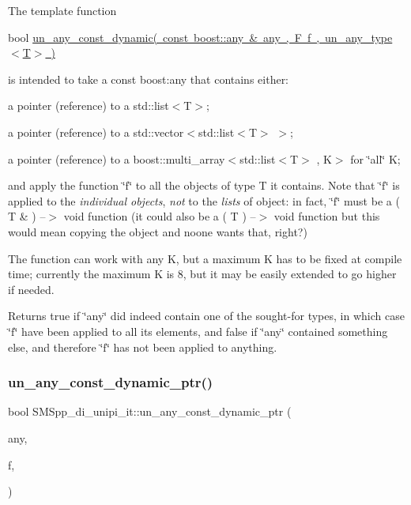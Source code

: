 The template function

bool \mbox{\hyperlink{group__boost__any__stuff_ga4bf31c5fd006a3483e0d5311259bd9e8}{un\+\_\+any\+\_\+const\+\_\+dynamic( const boost\+::any \& any , F f , un\+\_\+any\+\_\+type$<$\+T$>$ )}}

is intended to take a const boost\+:any that contains either\+:


\begin{DoxyItemize}
\item a pointer (reference) to a std\+::list$<$\+T$>$;
\item a pointer (reference) to a std\+::vector$<$std\+::list$<$\+T$>$ $>$;
\item a pointer (reference) to a boost\+::multi\+\_\+array$<$std\+::list$<$\+T$>$ , K$>$ for \char`\"{}all\char`\"{} K;
\end{DoxyItemize}

and apply the function \char`\"{}f\char`\"{} to all the objects of type T it contains. Note that \char`\"{}f\char`\"{} is applied to the {\itshape individual objects}, {\itshape not} to the {\itshape lists} of object\+: in fact, \char`\"{}f\char`\"{} must be a ( T \& ) --$>$ void function (it could also be a ( T ) --$>$ void function but this would mean copying the object and noone wants that, right?)

The function can work with any K, but a maximum K has to be fixed at compile time; currently the maximum K is 8, but it may be easily extended to go higher if needed.

Returns true if \char`\"{}any\char`\"{} did indeed contain one of the sought-\/for types, in which case \char`\"{}f\char`\"{} have been applied to all its elements, and false if \char`\"{}any\char`\"{} contained something else, and therefore \char`\"{}f\char`\"{} has not been applied to anything. \mbox{\label{group__boost__any__stuff_ga5497c469090a3757a1e45ec10a290289}} 
\subsubsection{\texorpdfstring{un\+\_\+any\+\_\+const\+\_\+dynamic\+\_\+ptr()}{un\_any\_const\_dynamic\_ptr()}}
{\footnotesize\ttfamily bool S\+M\+Spp\+\_\+di\+\_\+unipi\+\_\+it\+::un\+\_\+any\+\_\+const\+\_\+dynamic\+\_\+ptr (\begin{DoxyParamCaption}\item[{const boost\+::any \&}]{any,  }\item[{F}]{f,  }\item[{\mbox{\hyperlink{struct_s_m_spp__di__unipi__it_1_1un__any__type}{un\+\_\+any\+\_\+type}}$<$ T $>$}]{ }\end{DoxyParamCaption})}

